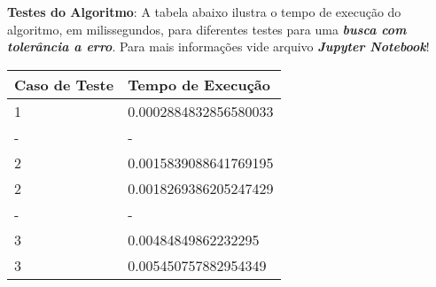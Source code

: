 \documentclass[paper=a4, fontsize=11pt]{scrartcl} %
\numberwithin{equation}{section} %
\numberwithin{figure}{section} %
\numberwithin{table}{section} %
\begin{document}
\pagebreak

\textbf{Testes do Algoritmo}: A tabela abaixo ilustra o tempo de execução do algoritmo, em milissegundos, para diferentes testes para uma \emph{\textbf{busca com tolerância a erro}}. Para mais informações vide arquivo \emph{\textbf{Jupyter Notebook}}!

\begin{table}[H]
\centering
\begin{tabular}{l|l}
Caso de Teste & Tempo de Execução \\\hline
1 & 0.0002884832856580033 \\
- & - \\
2 & 0.0015839088641769195 \\
2 & 0.0018269386205247429 \\
- & - \\
3 & 0.00484849862232295 \\
3 & 0.005450757882954349
\end{tabular}
\end{table}

\end{document}
